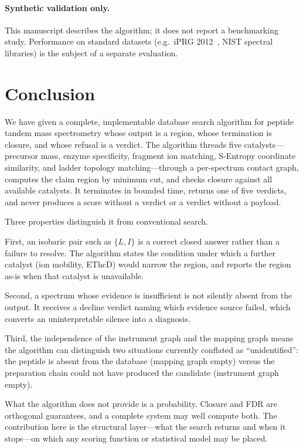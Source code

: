 \documentclass[11pt,a4paper]{article}
\theoremstyle{definition}
\theoremstyle{remark}
\begin{document}
\paragraph{Synthetic validation only.}
This manuscript describes the algorithm; it does not report a
benchmarking study. Performance on standard datasets
(e.g.\ iPRG 2012~\citep{chalkley2014proteomics}, NIST spectral
libraries) is the subject of a separate
evaluation.

\section{Conclusion}
\label{sec:conclusion}

We have given a complete, implementable database search algorithm for
peptide tandem mass spectrometry whose output is a region, whose
termination is closure, and whose refusal is a verdict. The algorithm
threads five catalysts---precursor mass, enzyme specificity, fragment
ion matching, S-Entropy coordinate similarity, and ladder topology
matching---through a per-spectrum contact graph, computes the claim
region by minimum cut, and checks closure against all available
catalysts. It terminates in bounded time, returns one of five verdicts,
and never produces a score without a verdict or a verdict without a
payload.

Three properties distinguish it from conventional search.

First, an isobaric pair such as $\{L,I\}$ is a correct closed answer
rather than a failure to resolve. The algorithm states the condition
under which a further catalyst (ion mobility, EThcD) would narrow the
region, and reports the region as-is when that catalyst is unavailable.

Second, a spectrum whose evidence is insufficient is not silently absent
from the output. It receives a decline verdict naming which evidence
source failed, which converts an uninterpretable silence into a
diagnosis.

Third, the independence of the instrument graph and the mapping graph
means the algorithm can distinguish two situations currently conflated
as ``unidentified'': the peptide is absent from the database (mapping
graph empty) versus the preparation chain could not have produced the
candidate (instrument graph empty).

What the algorithm does not provide is a probability. Closure and FDR
are orthogonal guarantees, and a complete system may well compute both.
The contribution here is the structural layer---what the search returns
and when it stops---on which any scoring function or statistical model
may be placed.
\end{document}
